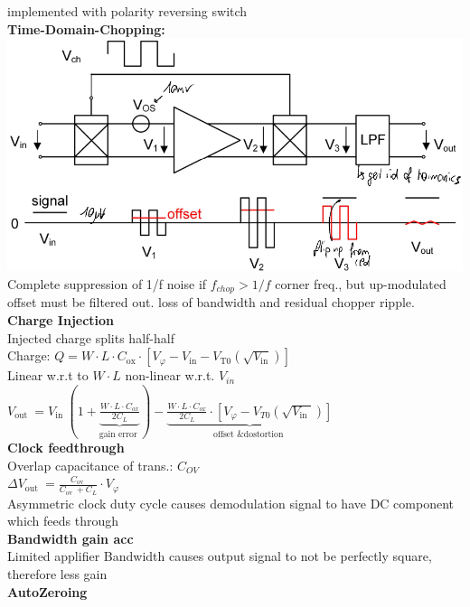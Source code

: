 \documentclass[5pt,landscape]{article}
\begin{document}
\begin{multicols*}{5}
implemented with polarity reversing switch\\
\textbf{Time-Domain-Chopping:}\\
\includegraphics[width=\columnwidth]{images/time_domain_chopping.png}\\
Complete suppression of 1/f noise if $ f_{chop} > 1/f $ corner freq., but up-modulated offset must be filtered out. loss of bandwidth and residual chopper ripple.
\textbf{Charge Injection}\\
Injected charge splits half-half\\
Charge: $ Q=W \cdot L \cdot C_{\mathrm{ox}} \cdot\left[V_{\varphi}-V_{\mathrm{in}}-V_{\mathrm{T} 0}\left(\sqrt{V_{\mathrm{in}}}\right)\right] $\\
Linear w.r.t to $ W\cdot L $ non-linear w.r.t. $ V_{in} $
$ V_{\text {out }}=V_{\text {in }}(1+\underbrace{\frac{W \cdot L \cdot C_{o x}}{2 C_{L}}}_{\text {gain error }})-\underbrace{\frac{W \cdot L \cdot C_{o x}}{2 C_{L}} \cdot\left[V_{\varphi}-V_{T 0}\left(\sqrt{V_{\text {in }}}\right)\right]}_{\text {offset \& dostortion }} $\\
\textbf{Clock feedthrough}\\
Overlap capacitance of trans.: $ C_{OV} $\\
$ \Delta V_{\text {out }}=\frac{C_{\text {ov }}}{C_{\text {ov }}+C_{L}} \cdot V_{\varphi} $\\
Asymmetric clock duty cycle causes demodulation signal to have DC component which feeds through\\
\textbf{Bandwidth gain acc}\\
Limited applifier Bandwidth causes output signal to not be perfectly square, therefore less gain\\
\textbf{AutoZeroing}\\





\end{multicols*}
\end{document}
